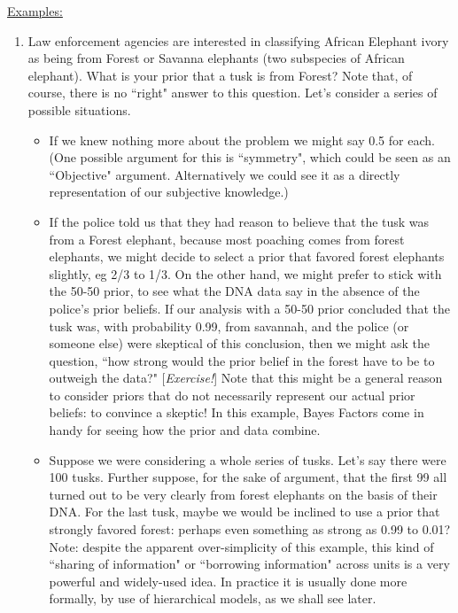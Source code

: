 \documentclass[12pt]{article}
\begin{document}
\underline{Examples:}
  
\begin{enumerate}
  \item Law enforcement agencies are interested in classifying African Elephant ivory as being from Forest or Savanna elephants (two subspecies of African elephant). What is your prior that a tusk is from Forest? Note that, of course, there is no ``right" answer to this question. Let's consider a series of possible situations. 
  \begin{itemize}
  \item If we knew nothing more about the problem we might say 0.5 for each. (One possible argument for this is ``symmetry", which could
  be seen as an ``Objective" argument. Alternatively we could see it as a directly representation of our subjective knowledge.)
  \item If the police told us that they had reason to believe that the tusk was from a Forest elephant, because most poaching comes from forest elephants, we might decide to select a prior that favored forest elephants slightly, eg 2/3 to 1/3. On the other hand, we might prefer to stick with the 50-50 prior, to see what the DNA data say in the absence of the police's prior beliefs. If our analysis with a 50-50 prior concluded that the tusk was, with probability 0.99, from savannah, and the police (or someone else) were skeptical of this conclusion, then we might ask the question, ``how strong would the prior belief in the forest have to be to outweigh the data?" [{\it Exercise!}] Note that this might be a general reason to consider priors that do not necessarily represent our actual prior beliefs: to convince a skeptic! In this example, Bayes Factors come in handy for seeing how the prior and data combine.
  \item Suppose we were considering a whole series of tusks. Let's say there were 100 tusks.
  Further suppose, for the sake of argument, that the first 99 all turned
  out to be very clearly from forest elephants
  on the basis of their DNA.  For the last tusk, maybe we would be inclined to use a prior that strongly favored forest: perhaps even something as strong as 0.99 to 0.01? Note: despite the apparent over-simplicity of this example, this kind of ``sharing of information" or ``borrowing information" across units is a very powerful and
  widely-used idea. In practice it is usually done more formally, by use of hierarchical models, as we shall see later.
\end{itemize}  
  

\end{enumerate}
\end{document}
